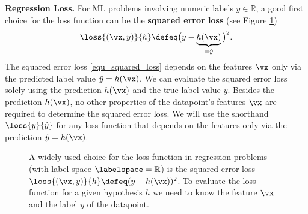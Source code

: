 \documentclass[12pt]{report}
\begin{document}
{\bf Regression Loss.} For ML problems involving numeric labels $y \in \mathbb{R}$, 
a good first choice for the loss function can be the {\bf squared error loss} (see Figure \ref{fig_squarederror_loss}) 
\begin{equation} 
\label{equ_squared_loss}
\loss{(\vx,y)}{h} \defeq \big(y - \underbrace{h(\vx)}_{=\hat{y}} \big)^{2}. 
\end{equation} 
The squared error loss \eqref{equ_squared_loss} depends on the 
features $\vx$ only via the predicted label value $\hat{y}= h(\vx)$. 
We can evaluate the squared error loss solely using the prediction $h(\vx)$ 
and the true label value $y$. Besides the prediction $h(\vx)$, no other 
properties of the datapoint's features $\vx$ are required to determine 
the squared error loss. We will use the shorthand $\loss{y}{\hat{y}}$ 
for any loss function that depends on the features only via the 
prediction $\hat{y}=h(\vx)$. 

\begin{figure}[htbp]
\begin{center}
     \vspace*{-4mm}
\end{center}
\caption{A widely used choice for the loss function in regression problems 
	(with label space $\labelspace=\mathbb{R}$) is the squared error loss $\loss{(\vx,y)}{h} \defeq (y - h(\vx))^{2}$. 
To evaluate the loss function for a given hypothesis $h$ we need to 
know the feature $\vx$ and the label $y$ of the datapoint.}
\label{fig_squarederror_loss}
\end{figure}
\end{document}
